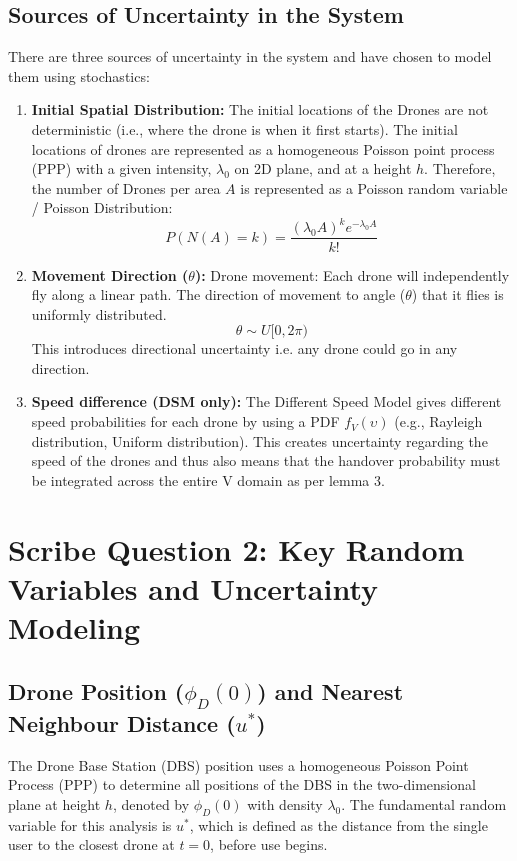 \documentclass[12pt,a4paper]{article}
\begin{document}
   \subsection*{Sources of Uncertainty in the System} %
   There are three sources of uncertainty in the system and have chosen to model them using stochastics: %
\begin{enumerate}
       \item \textbf{Initial Spatial Distribution:} %
    The initial locations of the Drones are not deterministic (i.e., where the drone is when it first starts).    %
    The initial locations of drones are represented as a homogeneous Poisson point process (PPP) with a given intensity, $\lambda_0$ on 2D plane, and at a height $h$.    %
       Therefore, the number of Drones per area $A$ is represented as a Poisson random variable / Poisson Distribution: %
       $$P(N(A)=k) = \frac{(\lambda_0 A)^k e^{-\lambda_0 A}}{k!}$$ %

       \item \textbf{Movement Direction ($\theta$):} %
    Drone movement: Each drone will independently fly along a linear path.    %
    The direction of movement to angle ($\theta$) that it flies is uniformly distributed.    %
       $$\theta \sim U[0,2\pi)$$ %
    This introduces directional uncertainty i.e. any drone could go in any direction.    %

       \item \textbf{Speed difference (DSM only):} %
    The Different Speed Model gives different speed probabilities for each drone by using a PDF $f_V(\upsilon)$ (e.g., Rayleigh distribution, Uniform distribution).    %
       This creates uncertainty regarding the speed of the drones and thus also means that the handover probability must be integrated across the entire V domain as per lemma 3. %
\end{enumerate}

\vspace{1em}
   \section*{Scribe Question 2: Key Random Variables and Uncertainty Modeling} %

   \subsection*{Drone Position ($\phi_D(0)$) and Nearest Neighbour Distance ($u^*$)} %
The Drone Base Station (DBS) position uses a homogeneous Poisson Point Process (PPP) to determine all positions of the DBS in the two-dimensional plane at height $h$, denoted by $\phi_D(0)$ with density $\lambda_0$.    %
The fundamental random variable for this analysis is $u^*$, which is defined as the distance from the single user to the closest drone at $t = 0$, before use begins.    %
\end{document}
